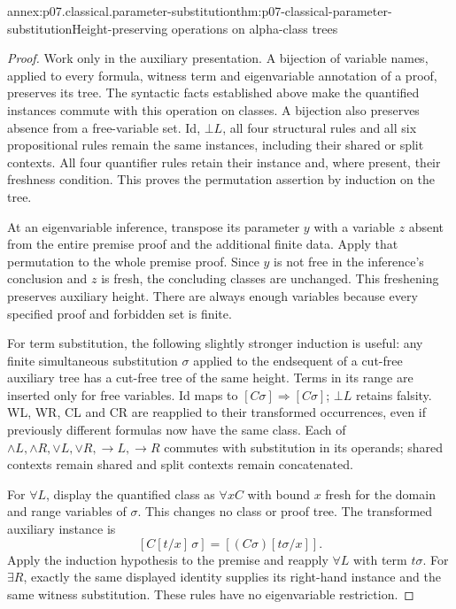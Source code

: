 \begin{annexitem}{annex:p07.classical.parameter-substitution}{thm:p07-classical-parameter-substitution}{Height-preserving operations on alpha-class trees}
\begin{proof}
Work only in the auxiliary presentation. A bijection of variable names,
applied to every formula, witness term and eigenvariable annotation of a
proof, preserves its tree. The syntactic facts established above make the
quantified instances commute with this operation on classes. A bijection
also preserves absence from a free-variable set. Id, \(\bot L\), all four
structural rules and all six propositional rules remain the same instances,
including their shared or split contexts. All four quantifier rules retain
their instance and, where present, their freshness condition. This proves
the permutation assertion by induction on the tree.

At an eigenvariable inference, transpose its parameter \(y\) with a
variable \(z\) absent from the entire premise proof and the additional
finite data. Apply that permutation to the whole premise proof. Since
\(y\) is not free in the inference's conclusion and \(z\) is fresh,
the concluding classes are unchanged. This freshening preserves auxiliary
height. There are always enough variables because every specified proof
and forbidden set is finite.

For term substitution, the following slightly stronger induction is useful:
any finite simultaneous substitution \(\sigma\) applied to the endsequent
of a cut-free auxiliary tree has a cut-free tree of the same height.
Terms in its range are inserted only for free variables. Id maps to
\([C\sigma]\Rightarrow[C\sigma]\); \(\bot L\) retains falsity.
WL, WR, CL and CR are reapplied to their transformed occurrences, even
if previously different formulas now have the same class. Each of
\(\land L,\land R,\lor L,\lor R,\to L,\to R\) commutes with
substitution in its operands; shared contexts remain shared and split
contexts remain concatenated.

For \(\forall L\), display the quantified class as \(\forall xC\)
with bound \(x\) fresh for the domain and range variables of \(\sigma\).
This changes no class or proof tree. The transformed auxiliary instance is
\[
 [C[t/x]\,\sigma]=[(C\sigma)[t\sigma/x]].
\]
Apply the induction hypothesis to the premise and reapply \(\forall L\)
with term \(t\sigma\). For \(\exists R\), exactly the same displayed
identity supplies its right-hand instance and the same witness substitution.
These rules have no eigenvariable restriction.


\end{proof}
\end{annexitem}
